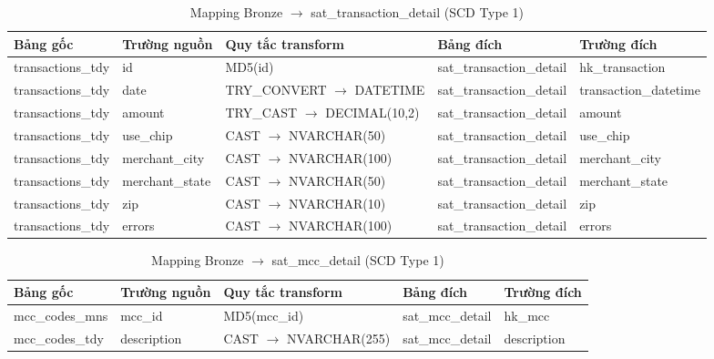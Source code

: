 \begin{table}[H]
\centering
\footnotesize

\begin{tabular}{lllll}
\hline
\textbf{Bảng gốc} & \textbf{Trường nguồn} & \textbf{Quy tắc transform} & \textbf{Bảng đích} & \textbf{Trường đích} \\
\hline
transactions\_tdy & id            & MD5(id)                    & sat\_transaction\_detail & hk\_transaction       \\
transactions\_tdy & date          & TRY\_CONVERT $\rightarrow$ DATETIME    & sat\_transaction\_detail & transaction\_datetime \\
transactions\_tdy & amount        & TRY\_CAST $\rightarrow$ DECIMAL(10,2)  & sat\_transaction\_detail & amount                \\
transactions\_tdy & use\_chip     & CAST $\rightarrow$ NVARCHAR(50)        & sat\_transaction\_detail & use\_chip             \\
transactions\_tdy & merchant\_city  & CAST $\rightarrow$ NVARCHAR(100)     & sat\_transaction\_detail & merchant\_city        \\
transactions\_tdy & merchant\_state & CAST $\rightarrow$ NVARCHAR(50)      & sat\_transaction\_detail & merchant\_state       \\
transactions\_tdy & zip           & CAST $\rightarrow$ NVARCHAR(10)        & sat\_transaction\_detail & zip                   \\
transactions\_tdy & errors        & CAST $\rightarrow$ NVARCHAR(100)       & sat\_transaction\_detail & errors                \\
\hline
\end{tabular}
\caption{Mapping Bronze $\rightarrow$ sat\_transaction\_detail (SCD Type 1)}
\end{table}

\begin{table}[H]
\centering
\footnotesize

\begin{tabular}{lllll}
\hline
\textbf{Bảng gốc} & \textbf{Trường nguồn} & \textbf{Quy tắc transform} & \textbf{Bảng đích} & \textbf{Trường đích} \\
\hline
mcc\_codes\_mns & mcc\_id     & MD5(mcc\_id)         & sat\_mcc\_detail & hk\_mcc      \\
mcc\_codes\_tdy & description & CAST $\rightarrow$ NVARCHAR(255) & sat\_mcc\_detail & description  \\
\hline
\end{tabular}
\caption{Mapping Bronze $\rightarrow$ sat\_mcc\_detail (SCD Type 1)}
\end{table}


